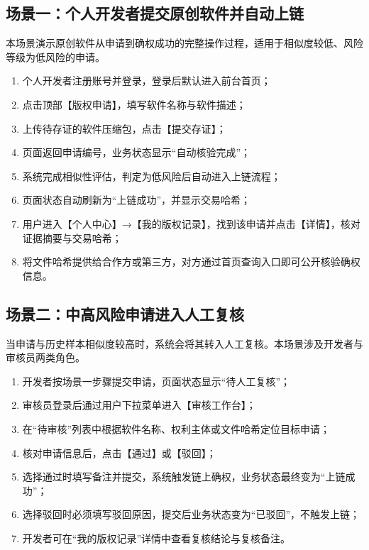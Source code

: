 \documentclass[UTF8,a4paper,12pt]{ctexart}
\begin{document}
\subsection{场景一：个人开发者提交原创软件并自动上链}
\indent 本场景演示原创软件从申请到确权成功的完整操作过程，适用于相似度较低、风险等级为低风险的申请。\par

\begin{enumerate}
  \item 个人开发者注册账号并登录，登录后默认进入前台首页；
  \item 点击顶部【版权申请】，填写软件名称与软件描述；
  \item 上传待存证的软件压缩包，点击【提交存证】；
  \item 页面返回申请编号，业务状态显示“自动核验完成”；
  \item 系统完成相似性评估，判定为低风险后自动进入上链流程；
  \item 页面状态自动刷新为“上链成功”，并显示交易哈希；
  \item 用户进入【个人中心】→【我的版权记录】，找到该申请并点击【详情】，核对证据摘要与交易哈希；
  \item 将文件哈希提供给合作方或第三方，对方通过首页查询入口即可公开核验确权信息。
\end{enumerate}

\subsection{场景二：中高风险申请进入人工复核}
\indent 当申请与历史样本相似度较高时，系统会将其转入人工复核。本场景涉及开发者与审核员两类角色。\par

\begin{enumerate}
  \item 开发者按场景一步骤提交申请，页面状态显示“待人工复核”；
  \item 审核员登录后通过用户下拉菜单进入【审核工作台】；
  \item 在“待审核”列表中根据软件名称、权利主体或文件哈希定位目标申请；
  \item 核对申请信息后，点击【通过】或【驳回】；
  \item 选择通过时填写备注并提交，系统触发链上确权，业务状态最终变为“上链成功”；
  \item 选择驳回时必须填写驳回原因，提交后业务状态变为“已驳回”，不触发上链；
  \item 开发者可在“我的版权记录”详情中查看复核结论与复核备注。
\end{enumerate}
\end{document}
